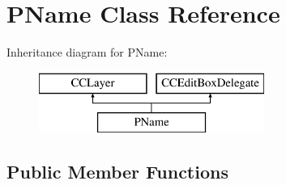 \hypertarget{class_p_name}{\section{P\-Name Class Reference}
\label{class_p_name}
}
Inheritance diagram for P\-Name\-:\begin{figure}[H]
\begin{center}
\leavevmode
\includegraphics[height=2.000000cm]{class_p_name}
\end{center}
\end{figure}
\subsection*{Public Member Functions}

